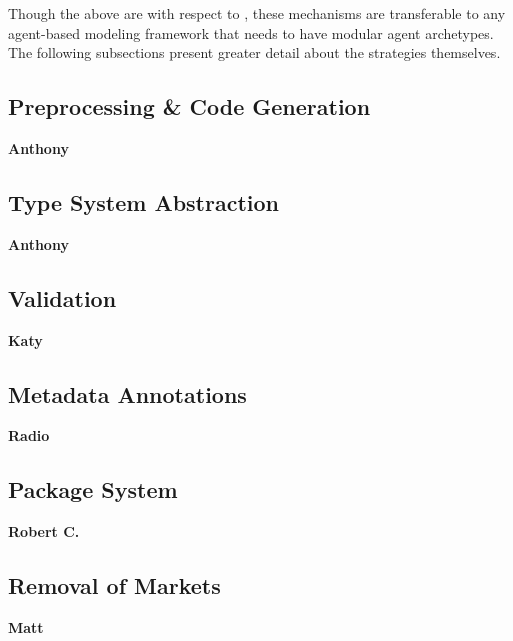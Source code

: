 Though the above are with respect to \cyclus, these mechanisms are 
transferable to any agent-based modeling framework that needs to have modular agent 
archetypes.  The following subsections present greater detail about the 
strategies themselves.

\subsection{Preprocessing \& Code Generation}

\textbf{Anthony}

\subsection{Type System Abstraction}

\textbf{Anthony}

\subsection{Validation}

\textbf{Katy}

\subsection{Metadata Annotations}

\textbf{Radio}

\subsection{Package System}

\textbf{Robert C.}

\subsection{Removal of Markets}

\textbf{Matt}
